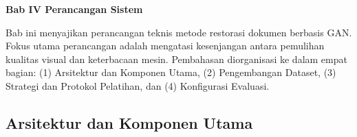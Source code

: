 \sloppy %
\onehalfspacing %



\vspace{2cm}
\begin{center}
  {\fontsize{14}{16.8}\selectfont\textbf{Bab IV \qquad Perancangan Sistem}}
\end{center}


\renewcommand{\thesection}{\Roman{section}}
\renewcommand{\thesubsection}{\thesection.\arabic{subsection}}
\renewcommand{\thesubsubsection}{\thesubsection.\arabic{subsubsection}}


\renewcommand{\thetable}{\thesection.\arabic{table}}

\renewcommand{\thefigure}{\thesection.\arabic{figure}}

\renewcommand{\theequation}{\thesection.\arabic{equation}}

\setcounter{section}{4}
\setcounter{subsection}{0}
\setcounter{table}{0}
\setcounter{figure}{0}
\label{sec:perancangan-implementasi}

Bab ini menyajikan perancangan teknis metode restorasi dokumen berbasis GAN. Fokus utama perancangan adalah mengatasi kesenjangan antara pemulihan kualitas visual dan keterbacaan mesin. Pembahasan diorganisasi ke dalam empat bagian: (1) Arsitektur dan Komponen Utama, (2) Pengembangan Dataset, (3) Strategi dan Protokol Pelatihan, dan (4) Konfigurasi Evaluasi.

\subsection{Arsitektur dan Komponen Utama}
\label{subsec:arsitektur-komponen-utama}

